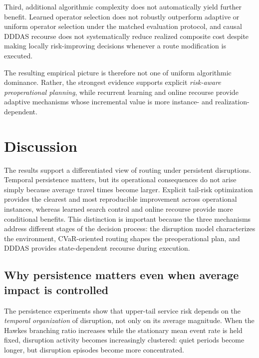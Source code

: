 \documentclass[preprint,12pt]{elsarticle}
\newcommand{\1}{\mathbf{1}}
\begin{document}
Third, additional algorithmic complexity does not automatically yield further
benefit. Learned operator selection does not robustly outperform adaptive or
uniform operator selection under the matched evaluation protocol, and causal
DDDAS recourse does not systematically reduce realized composite cost despite
making locally risk-improving decisions whenever a route modification is
executed.

The resulting empirical picture is therefore not one of uniform algorithmic
dominance. Rather, the strongest evidence supports explicit
\emph{risk-aware preoperational planning}, while recurrent learning and online
recourse provide adaptive mechanisms whose incremental value is more
instance- and realization-dependent.





\section{Discussion}
\label{sec:discussion}

The results support a differentiated view of routing under persistent
disruptions. Temporal persistence matters, but its operational consequences do
not arise simply because average travel times become larger. Explicit
tail-risk optimization provides the clearest and most reproducible improvement
across operational instances, whereas learned search control and online
recourse provide more conditional benefits. This distinction is important
because the three mechanisms address different stages of the decision process:
the disruption model characterizes the environment, CVaR-oriented routing
shapes the preoperational plan, and DDDAS provides state-dependent recourse
during execution.

\subsection{Why persistence matters even when average impact is controlled}
\label{subsec:discussion_persistence}

The persistence experiments show that upper-tail service risk depends on the
\emph{temporal organization} of disruption, not only on its average magnitude.
When the Hawkes branching ratio increases while the stationary mean event rate
is held fixed, disruption activity becomes increasingly clustered: quiet
periods become longer, but disruption episodes become more concentrated.
\end{document}
